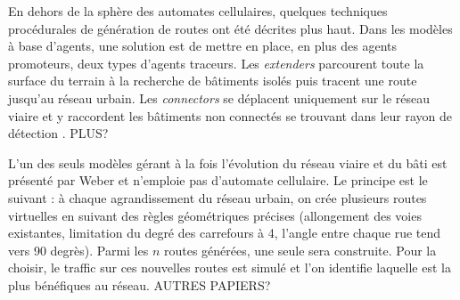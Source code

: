 \documentclass[10pt]{article}
\begin{document}
\begin{multicols}{2}
En dehors de la sphère des automates cellulaires, quelques techniques
procédurales de génération de routes ont été décrites plus haut. Dans
les modèles à base d'agents, une solution est de mettre en place, en
plus des agents promoteurs, deux types d'agents traceurs. Les
\textit{extenders} parcourent toute la surface du terrain à la
recherche de bâtiments isolés puis tracent une route jusqu'au réseau
urbain. Les \textit{connectors} se déplacent uniquement sur le réseau
viaire et y raccordent les bâtiments non connectés se trouvant dans
leur rayon de détection \cite{Lechnera}. PLUS?

L'un des seuls modèles gérant à la fois l'évolution du réseau viaire
et du bâti est présenté par Weber \cite{Weber2009} et n'emploie pas
d'automate cellulaire. Le principe est le suivant : à chaque
agrandissement du réseau urbain, on crée plusieurs routes virtuelles
en suivant des règles géométriques précises (allongement des voies
existantes, limitation du degré des carrefours à 4, l'angle entre
chaque rue tend vers 90 degrès). Parmi les $n$ routes générées, une
seule sera construite. Pour la choisir, le traffic sur ces nouvelles
routes est simulé et l'on identifie laquelle est la plus bénéfiques au
réseau. AUTRES PAPIERS?

\end{multicols}

\printbibliography
\end{document}
